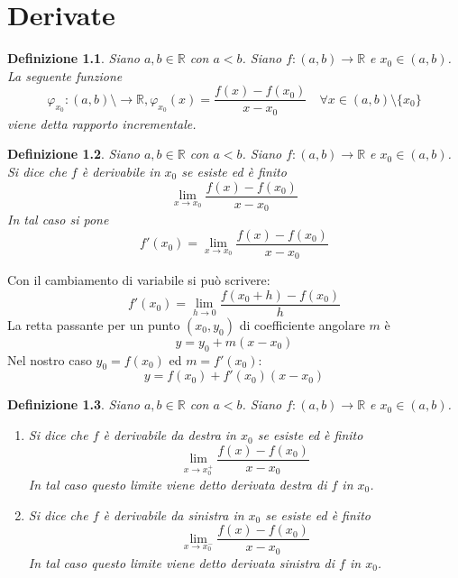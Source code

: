 \documentclass[11pt]{book}
\newtheorem{definition}{Definizione}[chapter]
\begin{document}
\chapter{Derivate}
\begin{definition}
    Siano $a,b\in\mathbb{R}$ con $a<b$. Siano $f:(a,b)\rightarrow\mathbb{R}$ e $x_0\in(a,b)$. La seguente funzione 
    \begin{equation*}
        \varphi_{x_0}:(a,b)\setminus\rightarrow\mathbb{R},\varphi_{x_0}(x)=\frac{f(x)-f(x_0)}{x-x_0}\quad\forall x\in(a,b)\setminus\{x_0\}
    \end{equation*}
    viene detta rapporto incrementale.
\end{definition}
\begin{definition}
    Siano $a,b\in\mathbb{R}$ con $a<b$. Siano $f:(a,b)\rightarrow\mathbb{R}$ e $x_0\in(a,b)$. Si dice che $f$ è derivabile 
    in $x_0$ se esiste ed è finito 
    \begin{equation*}
        \lim_{x\rightarrow x_0}\frac{f(x)-f(x_0)}{x-x_0}
    \end{equation*}
    In tal caso si pone 
    \begin{equation*}
        f'(x_0)=\lim_{x\rightarrow x_0}\frac{f(x)-f(x_0)}{x-x_0}
    \end{equation*}
\end{definition}
Con il cambiamento di variabile si può scrivere:
\begin{equation*}
    f'(x_0)=\lim_{h\rightarrow 0}\frac{f(x_0+h)-f(x_0)}{h}
\end{equation*}
La retta passante per un punto $(x_0,y_0)$ di coefficiente angolare $m$ è 
\begin{equation*}
    y=y_0+m(x-x_0)
\end{equation*}
Nel nostro caso $y_0=f(x_0)$ ed $m=f'(x_0)$:
\begin{equation*}
    y=f(x_0)+f'(x_0)(x-x_0)
\end{equation*}
\begin{definition}
    Siano $a,b\in\mathbb{R}$ con $a<b$. Siano $f:(a,b)\rightarrow\mathbb{R}$ e $x_0\in(a,b)$.
    \begin{enumerate}
        \item Si dice che $f$ è derivabile da destra in $x_0$ se esiste ed è finito 
        \begin{equation*}
            \lim_{x\rightarrow x_0^+}\frac{f(x)-f(x_0)}{x-x_0}
        \end{equation*}
        In tal caso questo limite viene detto derivata destra di $f$ in $x_0$.
        \item Si dice che $f$ è derivabile da sinistra in $x_0$ se esiste ed è finito 
        \begin{equation*}
            \lim_{x\rightarrow x_0^-}\frac{f(x)-f(x_0)}{x-x_0}
        \end{equation*}
        In tal caso questo limite viene detto derivata sinistra di $f$ in $x_0$.
    \end{enumerate}
\end{definition}
\end{document}
